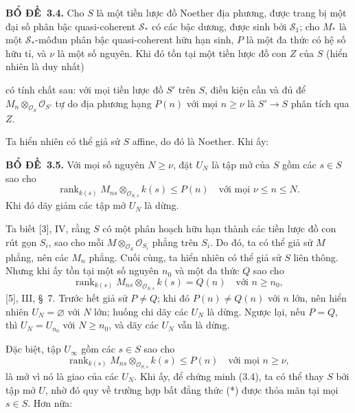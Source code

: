 \documentclass[11pt,twoside,openany]{book}
\numberwithin{equation}{section}
\newcommand{\src}[1]{%
  \phantomsection\hypertarget{src:\fgasourceid:#1}{}%
  \marginpar{\raggedleft\footnotesize\sffamily #1}%
}
\newcommand{\fgasourceid}{unset}
\newcommand{\result}[2]{\par\medskip\noindent\textbf{#1\if\relax\detokenize{#2}\relax\else\ #2\fi.}\quad}
\begin{document}
\result{BỔ ĐỀ}{3.4} Cho $S$ là một tiền lược đồ Noether địa phương, được trang
bị một đại số phân bậc quasi-coherent $\mathcal S_*$ có các bậc dương, được
sinh bởi $\mathcal S_1$; cho $M_*$ là một $\mathcal S_*$-môđun phân bậc quasi-coherent
hữu hạn sinh, $P$ là một đa thức có hệ số hữu tỉ, và $\nu$ là một số nguyên.
Khi đó tồn tại một tiền lược đồ con $Z$ của $S$ (hiển nhiên là duy nhất)
\src{263}
có tính chất sau: với mọi tiền lược đồ $S'$ trên $S$, điều kiện cần và đủ để
$M_n\otimes_{\mathcal O_S}\mathcal O_{S'}$ tự do địa phương hạng $P(n)$ với
mọi $n\geq\nu$ là $S'\longrightarrow S$ phân tích qua $Z$.

Ta hiển nhiên có thể giả sử $S$ affine, do đó là Noether. Khi ấy:

\result{BỔ ĐỀ}{3.5} Với mọi số nguyên $N\geq\nu$, đặt $U_N$ là tập mở của $S$
gồm các $s\in S$ sao cho
\[
\operatorname{rank}_{k(s)}
M_{ns}\otimes_{\mathcal O_{S,s}}k(s)\leq P(n)
\quad\text{với mọi $\nu\leq n\leq N$}.
\]
Khi đó dãy giảm các tập mở $U_N$ là dừng.

Ta biết [3], IV, rằng $S$ có một phân hoạch hữu hạn thành các tiền lược đồ con
rút gọn $S_i$, sao cho mỗi $M\otimes_{\mathcal O_S}\mathcal O_{S_i}$ phẳng
trên $S_i$. Do đó, ta có thể giả sử $M$ phẳng, nên các $M_n$ phẳng. Cuối cùng,
ta hiển nhiên có thể giả sử $S$ liên thông. Nhưng khi ấy tồn tại một số nguyên
$n_0$ và một đa thức $Q$ sao cho
\[
\operatorname{rank}_{k(s)}
M_{ns}\otimes_{\mathcal O_{S,s}}k(s)=Q(n)
\quad\text{với $n\geq n_0$},
\]
[5], III, \S~7. Trước hết giả sử $P\neq Q$; khi đó
$P(n)\neq Q(n)$ với $n$ lớn, nên hiển nhiên $U_N=\varnothing$ với $N$ lớn;
huống chi dãy các $U_N$ là dừng. Ngược lại, nếu $P=Q$, thì
$U_N=U_{n_0}$ với $N\geq n_0$, và dãy các $U_N$ vẫn là dừng.

Đặc biệt, tập $U_\infty$ gồm các $s\in S$ sao cho
\[
\tag{*}
\operatorname{rank}_{k(s)}
M_{ns}\otimes_{\mathcal O_{S,s}}k(s)\leq P(n)
\quad\text{với mọi $n\geq\nu$},
\]
là mở vì nó là giao của các $U_N$. Khi ấy, để chứng minh (3.4), ta có thể thay
$S$ bởi tập mở $U$, nhờ đó quy về trường hợp bất đẳng thức (*) được thỏa mãn
tại mọi $s\in S$. Hơn nữa:
\end{document}

